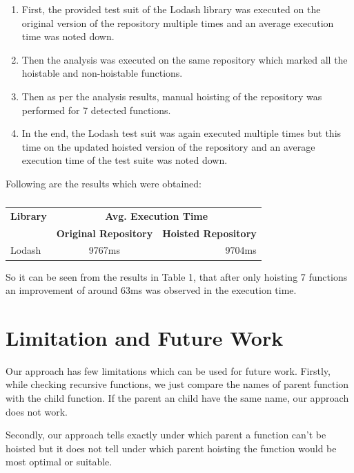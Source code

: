 \documentclass[authoryear,preprint]{sigplanconf}
\begin{document}
\begin{enumerate}
  \item First, the provided test suit of the Lodash library was executed on the original version of the repository multiple times and an average execution time was noted down.
  \item Then the analysis was executed on the same repository which marked all the hoistable and non-hoistable functions.  
  \item Then as per the analysis results, manual hoisting of the repository was performed for 7 detected functions.
  \item In the end, the Lodash test suit was again executed multiple times but this time on the updated hoisted version of the repository and an average execution time of the test suite was noted down.
  \end{enumerate}

Following are the results which were obtained:
\begin{table}[h!]
  \begin{center}
    \caption{}
    \label{tab:evaluation}
    \begin{tabular}{l|c|r|} %
      \textbf{Library} & \multicolumn{2}{c|}{\textbf{Avg. Execution Time}}\\
      \textbf{} & \textbf{Original Repository} & \textbf{Hoisted Repository}\\
      \hline
      Lodash & 9767ms & 9704ms\\
    \end{tabular}
  \end{center}
\end{table}


So it can be seen from the results in Table 1, that after only hoisting 7 functions an improvement of around 63ms was observed in the execution time.

\section{Limitation and Future Work}
\label{sec:limitation}
Our approach has few limitations which can be used for future work. Firstly, while checking recursive functions, we just compare the names of parent function with the child function. If the parent an child have the same name, our approach does not work. \par

Secondly, our approach tells exactly under which parent a function can't be hoisted but it does not tell under which parent hoisting the function would be most optimal or suitable.
\end{document}
